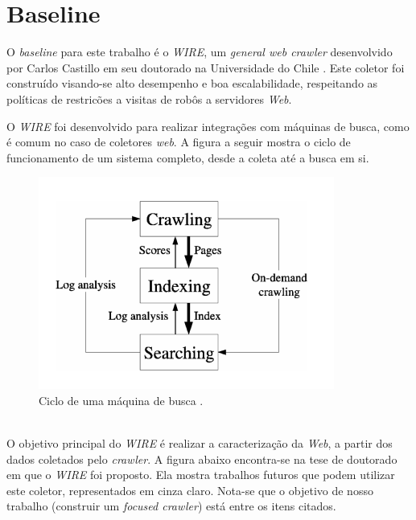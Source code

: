 \documentclass[a4paper,12pt,titlepage]{article}
\begin{document}
\section{Baseline}

O \textit{baseline} para este trabalho é o \textit{WIRE}, um \textit{general web crawler} desenvolvido por Carlos Castillo em seu doutorado na Universidade do Chile \cite{carlos}. Este coletor foi construído visando-se alto desempenho e boa escalabilidade, respeitando as políticas de restricões a visitas de robôs a servidores \textit{Web}.

O \textit{WIRE} foi desenvolvido para realizar integrações com máquinas de busca, como é comum no caso de coletores \textit{web}. A figura a seguir mostra o ciclo de funcionamento de um sistema completo, desde a coleta até a busca em si.

\begin{figure}[H]
     \centering
     \includegraphics[scale=0.3]{figures/search-engine-cycle.png}
     \caption{Ciclo de uma máquina de busca \cite{carlos}.}
     \label{bsp}
\end{figure}

\ \\

O objetivo principal do \textit{WIRE} é realizar a caracterização da \textit{Web}, a partir dos dados coletados pelo \textit{crawler}. A figura abaixo encontra-se na tese de doutorado em que o \textit{WIRE} foi proposto. Ela mostra trabalhos futuros que podem utilizar este coletor, representados em cinza claro. Nota-se que o objetivo de nosso trabalho (construir um \textit{focused crawler}) está entre os itens citados.
\end{document}
